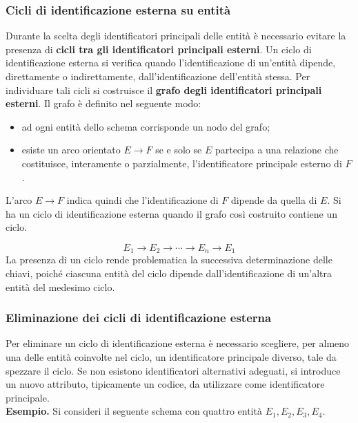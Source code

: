 \subsubsection{Cicli di identificazione esterna
su entità}

Durante la scelta degli identificatori principali
delle entità è necessario evitare la presenza di
\textbf{cicli tra gli identificatori principali
esterni}.
Un ciclo di identificazione esterna si verifica
quando l'identificazione di un'entità dipende,
direttamente o indirettamente, dall'identificazione
dell'entità stessa.
Per individuare tali cicli si costruisce il
\textbf{grafo degli identificatori principali
esterni}.
Il grafo è definito nel seguente modo:

\begin{itemize}
    \item ad ogni entità dello schema corrisponde
    un nodo del grafo;

    \item esiste un arco orientato $E\rightarrow F$
    se e solo se $E$ partecipa a una relazione
    che costituisce, interamente o parzialmente,
    l'identificatore principale esterno di $F$.
\end{itemize}
\noindent
L'arco $E\rightarrow F$ indica quindi che
l'identificazione di $F$ dipende da quella di $E$.
Si ha un ciclo di identificazione esterna quando
il grafo così costruito contiene un ciclo.

\[
E_1\rightarrow E_2\rightarrow\cdots
\rightarrow E_n\rightarrow E_1
\]
La presenza di un ciclo rende problematica
la successiva determinazione delle chiavi,
poiché ciascuna entità del ciclo dipende
dall'identificazione di un'altra entità
del medesimo ciclo.

\subsubsection*{Eliminazione dei cicli di
identificazione esterna}

Per eliminare un ciclo di identificazione
esterna è necessario scegliere, per almeno
una delle entità coinvolte nel ciclo, un
identificatore principale diverso, tale da
spezzare il ciclo.
Se non esistono identificatori alternativi
adeguati, si introduce un nuovo attributo,
tipicamente un codice, da utilizzare come
identificatore principale.\medskip\\
\noindent
\textcolor{verdeEsempio}{\textbf{Esempio. }}
Si consideri il seguente schema con quattro
entità $E_1,E_2,E_3,E_4$.

